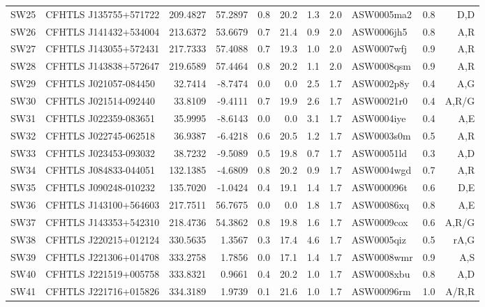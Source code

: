 \documentclass[useAMS,usenatbib,a4paper]{mn2e}
\begin{document}
\begin{center}
\begin{longtable}{llrrrrrrlrr}
SW25 & CFHTLS J135755+571722 &  209.4827 &   57.2897 &  0.8 & 20.2 &  1.3 &  2.0 & ASW0005ma2 &  0.8  &  D,D   \\
SW26 & CFHTLS J141432+534004 &  213.6372 &   53.6679 &  0.7 & 21.4 &  0.9 &  2.0 & ASW0006jh5 &  0.8  &  A,R   \\
SW27 & CFHTLS J143055+572431 &  217.7333 &   57.4088 &  0.7 & 19.3 &  1.0 &  2.0 & ASW0007wfj &  0.9  &  A,R   \\
SW28 & CFHTLS J143838+572647 &  219.6589 &   57.4464 &  0.8 & 20.2 &  1.1 &  2.0 & ASW0008qsm &  0.9  &  A,R   \\
SW29 & CFHTLS J021057-084450 &   32.7414 &   -8.7474 &  0.0 &  0.0 &  2.5 &  1.7 & ASW0002p8y &  0.4  &  A,G   \\
SW30 & CFHTLS J021514-092440 &   33.8109 &   -9.4111 &  0.7 & 19.9 &  2.6 &  1.7 & ASW00021r0 &  0.4  &  A,R/G   \\
SW31 & CFHTLS J022359-083651 &   35.9995 &   -8.6143 &  0.0 &  0.0 &  3.1 &  1.7 & ASW0004iye &  0.4  &  A,E   \\
SW32 & CFHTLS J022745-062518 &   36.9387 &   -6.4218 &  0.6 & 20.5 &  1.2 &  1.7 & ASW0003s0m &  0.5  &  A,R   \\
SW33 & CFHTLS J023453-093032 &   38.7232 &   -9.5089 &  0.5 & 19.8 &  0.7 &  1.7 & ASW00051ld &  0.3  &  A,D   \\
SW34 & CFHTLS J084833-044051 &  132.1385 &   -4.6809 &  0.8 & 20.2 &  0.9 &  1.7 & ASW0004wgd &  0.7  &  A,R   \\
SW35 & CFHTLS J090248-010232 &  135.7020 &   -1.0424 &  0.4 & 19.1 &  1.4 &  1.7 & ASW000096t &  0.6  &  D,E   \\
SW36 & CFHTLS J143100+564603 &  217.7511 &   56.7675 &  0.0 &  0.0 &  1.8 &  1.7 & ASW00086xq &  0.8  &  A,E   \\
SW37 & CFHTLS J143353+542310 &  218.4736 &   54.3862 &  0.8 & 19.8 &  1.6 &  1.7 & ASW0009cox &  0.6  &  A,R/G   \\
SW38 & CFHTLS J220215+012124 &  330.5635 &    1.3567 &  0.3 & 17.4 &  4.6 &  1.7 & ASW0005qiz &  0.5  &  rA,G   \\
SW39 & CFHTLS J221306+014708 &  333.2758 &    1.7856 &  0.0 & 17.1 &  1.4 &  1.7 & ASW0008wmr &  0.9  &  A,S   \\
SW40 & CFHTLS J221519+005758 &  333.8321 &    0.9661 &  0.4 & 20.2 &  1.0 &  1.7 & ASW0008xbu &  0.8  &  A,D   \\
SW41 & CFHTLS J221716+015826 &  334.3189 &    1.9739 &  0.1 & 21.6 &  1.0 &  1.7 & ASW00096rm &  1.0  &  A/R,R   \\

\end{longtable}
\end{center}
\end{document}
